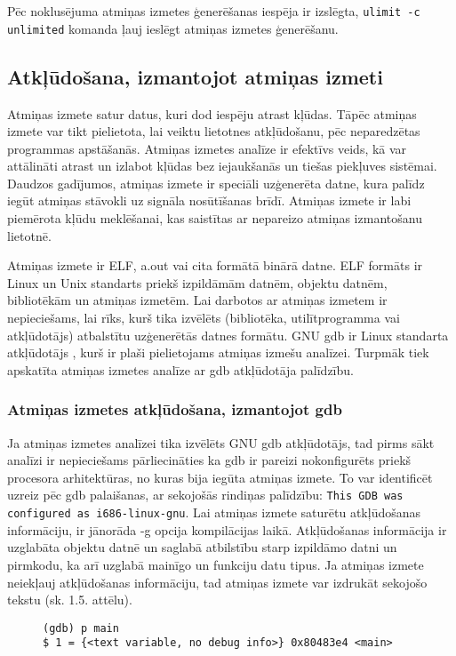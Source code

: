  Pēc noklusējuma atmiņas izmetes ģenerēšanas iespēja ir izslēgta,  \texttt{ulimit -c unlimited} komanda ļauj ieslēgt atmiņas izmetes ģenerēšanu.

\subsection{Atkļūdošana, izmantojot atmiņas izmeti}
Atmiņas izmete satur datus, kuri dod iespēju atrast kļūdas. Tāpēc atmiņas izmete var tikt pielietota, lai veiktu lietotnes atkļūdošanu, pēc neparedzētas programmas apstāšanās.
Atmiņas izmetes analīze ir efektīvs veids, kā var attālināti atrast un izlabot kļūdas bez iejaukšanās un tiešas piekļuves sistēmai.
Daudzos gadījumos, atmiņas izmete ir speciāli uzģenerēta datne, kura palīdz iegūt atmiņas stāvokli uz signāla nosūtīšanas brīdī.
Atmiņas izmete ir labi piemērota kļūdu meklēšanai, kas saistītas ar nepareizo atmiņas izmantošanu lietotnē.

Atmiņas izmete ir ELF, a.out vai cita formātā binārā  datne. 
ELF formāts ir Linux un Unix standarts priekš izpildāmām datnēm, objektu datnēm, bibliotēkām un atmiņas izmetēm.
Lai darbotos ar atmiņas izmetem ir nepieciešams, lai rīks, kurš tika izvēlēts (bibliotēka, utilītprogramma vai atkļūdotājs) atbalstītu uzģenerētās datnes formātu.
GNU gdb ir  Linux standarta atkļūdotājs \cite{MWMK}, kurš ir plaši pielietojams atmiņas izmešu analīzei. 
Turpmāk tiek apskatīta atmiņas izmetes analīze ar gdb atkļūdotāja palīdzību.

\subsubsection{Atmiņas izmetes atkļūdošana, izmantojot gdb }
 \label{subsec:debugg_gdb}
Ja atmiņas izmetes analīzei tika izvēlēts GNU gdb atkļūdotājs, tad pirms sākt analīzi ir nepieciešams pārliecināties ka gdb ir pareizi nokonfigurēts priekš procesora arhitektūras, no kuras bija iegūta atmiņas izmete.
To var identificēt uzreiz pēc gdb palaišanas, ar sekojošās rindiņas palīdzību: \texttt{This GDB was configured as i686-linux-gnu}.  
Lai atmiņas izmete saturētu atkļūdošanas informāciju, ir jānorāda -g opcija kompilācijas laikā.
Atkļūdošanas informācija ir uzglabāta objektu datnē un saglabā atbilstību starp izpildāmo datni un pirmkodu, ka arī uzglabā mainīgo un funkciju datu tipus.
Ja atmiņas izmete neiekļauj atkļūdošanas informāciju, tad atmiņas izmete var izdrukāt sekojošo tekstu (sk. 1.5. attēlu).

\begin{figure}[h]
\begin{lstlisting}[style=customgdb]
(gdb) p main
$ 1 = {<text variable, no debug info>} 0x80483e4 <main>
\end{lstlisting}
\caption{\textbf{\fontsize{11}{12}\selectfont {Atmiņas izmete nesatur atkļūdošanas informāciju}}}
\end{figure}


